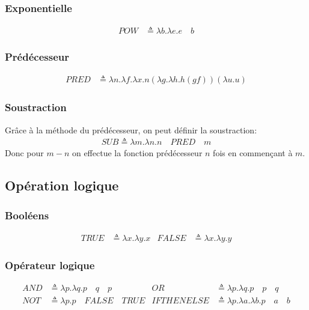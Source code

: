 \documentclass{report}
\begin{document}
\subsubsection{Exponentielle}
\begin{align*}
POW &\triangleq \lambda b.\lambda e.e \quad b
\end{align*}

\subsubsection{Prédécesseur}
\begin{align*}
PRED &\triangleq \lambda n.\lambda f.\lambda x.n (\lambda g.\lambda h.h (g f)) (\lambda u.u)
\end{align*}

\subsubsection{Soustraction}
Grâce à la méthode du prédécesseur, on peut définir la soustraction:
\begin{align*}
SUB \triangleq \lambda m.\lambda n.n \quad PRED \quad m
\end{align*}
Donc pour $m-n$ on effectue la fonction prédécesseur $n$ fois en commençant à $m$. 

\subsection{Opération logique}

\subsubsection{Booléens}
\begin{align*}
TRUE &\triangleq \lambda x.\lambda y.x & FALSE &\triangleq \lambda x.\lambda y.y
\end{align*}

\subsubsection{Opérateur logique}
\begin{align*}
AND &\triangleq \lambda p.\lambda q.p \quad q \quad p & OR &\triangleq \lambda p.\lambda q.p \quad p \quad q\\
NOT &\triangleq \lambda p.p \quad FALSE \quad TRUE & IFTHENELSE &\triangleq \lambda p.\lambda a.\lambda b.p \quad a \quad b
\end{align*} 
\end{document}
